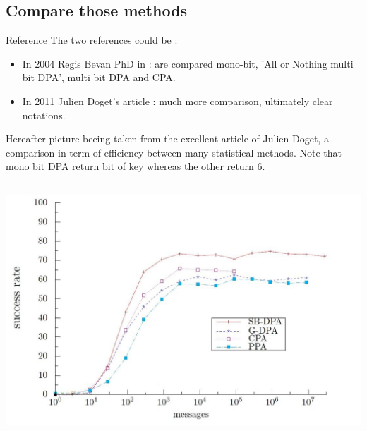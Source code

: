 \newpage
\subsection{Compare those methods}
Reference
The two references could be :
\begin{itemize}
	\item In 2004 Regis Bevan PhD in : are compared mono-bit, 'All or Nothing multi bit DPA', multi bit DPA and CPA.
	\item In 2011 Julien Doget's article  : much more comparison, ultimately clear notations.
\end{itemize} 

Hereafter picture beeing taken from the excellent article of Julien Doget, 
a comparison in term of efficiency between many statistical methods. 
Note that mono bit DPA return bit of key whereas the other return 6.

\begin{center}
\includegraphics[width=140mm,height=95mm]{images/compare.jpg}\\
\end{center}
